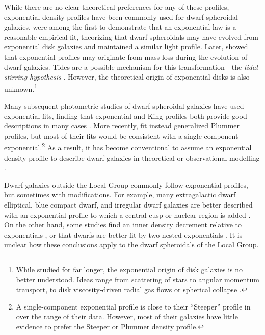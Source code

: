 While there are no clear theoretical preferences for any of these
profiles, exponential density profiles have been commonly used for dwarf
spheroidal galaxies. \citet{faber+lin1983} were among the first to
demonstrate that an exponential law is a reasonable empirical fit,
theorizing that dwarf spheroidals may have evolved from exponential disk
galaxies and maintained a similar light profile. Later,
\citet{read+gilmore2005} showed that exponential profiles may originate
from mass loss during the evolution of dwarf galaxies. Tides are a
possible mechanism for this transformation---the \emph{tidal stirring
hypothesis} \citep{mayer+2001a, klimentowski+2009}. However, the
theoretical origin of exponential disks is also unknown.\footnote{While
  studied for far longer, the exponential origin of disk galaxies is no
  better understood. Ideas range from scattering of stars
  \citep{elmegreen+struck2013, wu+2022} to angular momentum transport,
  to disk viscosity-driven radial gas flows
  \citep{lin+pringle1987, wang+lilly2022} or spherical collapse
  \citep{freeman1970}.}

Many subsequent photometric studies of dwarf spheroidal galaxies have
used exponential fits, finding that exponential and King profiles both
provide good descriptions in many cases
\citep{binggeli+sandage+tarenghi1984, mateo1998, mcconnachie+irwin2006, cicuendez+2018}.
More recently, \citet{moskowitz+walker2020} fit instead generalized
Plummer profiles, but most of their fits would be consistent with a
single-component exponential.\footnote{A single-component exponential
  profile is close to their ``Steeper'' profile in
  \citet{moskowitz+walker2020} over the range of their data. However,
  most of their galaxies have little evidence to prefer the Steeper or
  Plummer density profile.} As a result, it has become conventional to
assume an exponential density profile to describe dwarf galaxies in
theoretical or observational modelling
\citep[e.g.,][]{kowalczyk+2013, martin+2016, MV2020a, battaglia+2022}.

Dwarf galaxies outside the Local Group commonly follow exponential
profiles, but sometimes with modifications. For example, many
extragalactic dwarf elliptical, blue compact dwarf, and irregular dwarf
galaxies are better described with an exponential profile to which a
central cusp or nuclear region is added
\citep{caldwell+bothun1987, noeske+2003}. On the other hand, some
studies find an inner density decrement relative to exponentials
\citep[e.g.,][]{caldwell+1992, makarov+2012}, or that dwarfs are better
fit by two nested exponentials
\citep[e.g.,][]{aparicio+1997, graham+guzman2003, hunter+elmegreen2006, lee+2018}.
It is unclear how these conclusions apply to the dwarf spheroidals of
the Local Group.

